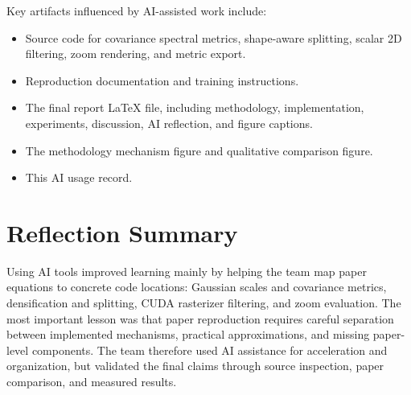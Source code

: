 \documentclass[10pt]{article}
\begin{document}
Key artifacts influenced by AI-assisted work include:
\begin{itemize}
    \item Source code for covariance spectral metrics, shape-aware splitting, scalar 2D filtering, zoom rendering, and metric export.
    \item Reproduction documentation and training instructions.
    \item The final report LaTeX file, including methodology, implementation, experiments, discussion, AI reflection, and figure captions.
    \item The methodology mechanism figure and qualitative comparison figure.
    \item This AI usage record.
\end{itemize}

\section*{Reflection Summary}

Using AI tools improved learning mainly by helping the team map paper equations to concrete code locations: Gaussian scales and covariance metrics, densification and splitting, CUDA rasterizer filtering, and zoom evaluation. The most important lesson was that paper reproduction requires careful separation between implemented mechanisms, practical approximations, and missing paper-level components. The team therefore used AI assistance for acceleration and organization, but validated the final claims through source inspection, paper comparison, and measured results.
\end{document}
